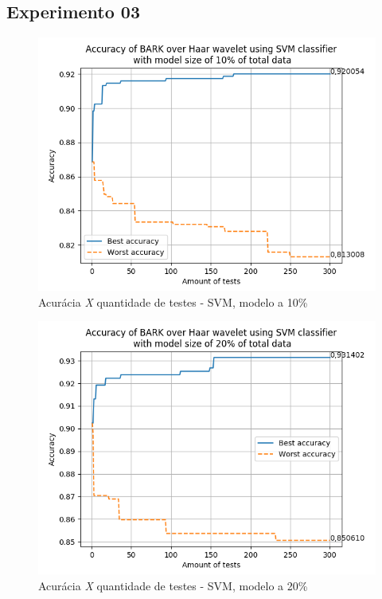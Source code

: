 \begin{myenv}{1.5}
		\section{Experimento 03}

		\newpage
		\begin{figure}[h]
			\centering
			\includegraphics{images/results/confusionMatrices/classifier_SVM_10.png}
			\caption{Acurácia \textit{X} quantidade de testes - SVM, modelo a 10\%}
			\label{fig:classifiersvm10}
		\end{figure}
		

		\newpage
		\begin{figure}[h]
			\centering
			\includegraphics{images/results/confusionMatrices/classifier_SVM_20.png}
			\caption{Acurácia \textit{X} quantidade de testes - SVM, modelo a 20\%}
			\label{fig:classifiersvm20}
		\end{figure}
		
		

\end{myenv}
